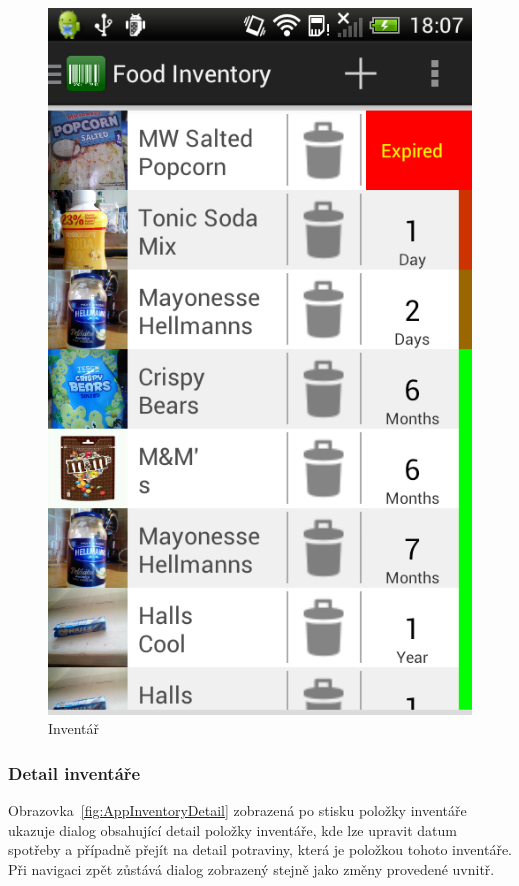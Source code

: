 \documentclass[thesis=B,czech]{FITthesis}[2013/10/20]
\begin{document}
\begin{figure}[H]
  \centering
  \includegraphics[scale=0.4]{screenshots/app_inventory.png}
  \caption{Inventář}
  \label{fig:AppInventory}
\end{figure}

\clearpage

\subsubsection{Detail inventáře}

Obrazovka~\ref{fig:AppInventoryDetail} zobrazená po stisku položky inventáře ukazuje dialog obsahující detail položky inventáře, kde lze upravit datum spotřeby a případně přejít na detail potraviny, která je položkou tohoto inventáře. Při navigaci zpět zůstává dialog zobrazený stejně jako změny provedené uvnitř.
\end{document}

